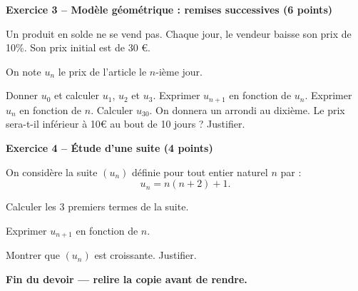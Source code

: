 \documentclass[12pt,a4paper]{exam}
\begin{document}
\noindent\hrulefill
\vspace{0.5cm}

\textbf{Exercice 3 – Modèle géométrique : remises successives (6 points)}
\vspace{5pt}

Un produit en solde ne se vend pas. Chaque jour, le vendeur baisse son prix de 10\%.
Son prix initial est de 30 €.

On note \(u_n\) le prix de l'article le \(n\)-ième jour.

\begin{questions}
    \question[1] Donner $u_0$ et calculer $u_1$, $u_2$ et $u_3$.
    \question[1,5] Exprimer $u_{n+1}$ en fonction de $u_n$.
    \question[1] Exprimer \(u_n\) en fonction de $n$.
    \question[1] Calculer $u_{30}$. On donnera un arrondi au dixième.
    \question[1,5] Le prix sera-t-il inférieur à 10€ au bout de 10 jours ? Justifier.
\end{questions}

\noindent\hrulefill
\vspace{0.5cm}

\textbf{Exercice 4 – Étude d'une suite (4 points)}
\vspace{5pt}

On considère la suite $(u_n)$ définie pour tout entier naturel $n$ par :
\[
u_n = n(n+2) + 1.
\]

\begin{questions}
    \question[1] Calculer les 3 premiers termes de la suite.

    \question[1] Exprimer $u_{n+1}$ en fonction de $n$.

    \question[2] Montrer que $(u_n)$ est croissante. Justifier.
\end{questions}

\noindent\hrulefill


\vspace{0.5cm}
\begin{center}
\textbf{Fin du devoir — relire la copie avant de rendre.}
\end{center}
\end{document}
